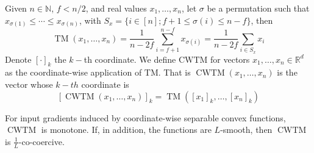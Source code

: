 \documentclass[twoside,11pt]{article}
\newcommand\mc{\mathcal}
\newcommand\mb{\mathbb}
\begin{document}
\begin{definition}\label{cwtm-definition}
    Given $n \in \mb{N}$, $f < n/2$, and real values $x_1, \ldots, x_n$, let $\sigma$ be a permutation such that $x_{\sigma(1)} \leq \cdots \leq x_{\sigma(n)}$, with $S_x=\{i \in [n]; f+1 \leq \sigma(i) \leq n-f\}$, then
    \[
        \operatorname{TM}(x_1, \ldots, x_n) 
        = \frac{1}{n-2f} \sum_{i=f+1}^{n-f} x_{\sigma(i)} 
        = \frac{1}{n-2f} \sum_{i \in S_x} x_i
    \]
    Denote ${\left[ \cdot \right]}_k$ the $k-$th coordinate.
    We define $\mathrm{CWTM}$ for vectors $x_1, \ldots, x_n \in \mb{R}^d$ as the coordinate-wise application of $\mathrm{TM}$.
    That is $\operatorname{CWTM}(x_1, \ldots, x_n)$ is the vector whose $k-th$ coordinate is
    \[
        {[\operatorname{CWTM}(x_1, \ldots, x_n)]}_k = \operatorname{TM}({[x_1]}_k, \ldots, {[x_n]}_k)
    \]
\end{definition}
\begin{lemma}\label{lemma-cwtm-1d-nonexpansive}
    For input gradients induced by coordinate-wise separable convex functions, $\operatorname{CWTM}$ is monotone. 
    If, in addition, the functions are $L$-smooth, then $\operatorname{CWTM}$ is $\tfrac{1}{L}$-co-coercive.
\end{lemma}
\end{document}
